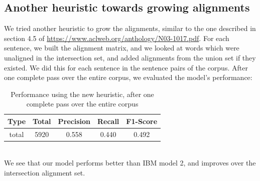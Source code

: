 \documentclass{article}
\begin{document}
	\subsection{Another heuristic towards growing alignments}
	We tried another heuristic to grow the alignments, similar to the one described in section 4.5 of \href{https://www.aclweb.org/anthology/N03-1017.pdf}{https://www.aclweb.org/anthology/N03-1017.pdf}. For each sentence, we built the alignment matrix, and we looked at words which were unaligned in the intersection set, and added alignments from the union set if they existed. We did this for each sentence in the sentence pairs of the corpus. After one complete pass over the entire corpus, we evaluated the model's performance:
	\begin{table}[htbp]
	\center
	\begin{tabular}{|c|c|c|c|c|}
	\hline
	Type&Total&Precision&Recall&F1-Score\\
	\hline
	total&        5920&     0.558&        0.440&        0.492\\
	\hline
	\end{tabular}
	\caption{Performance using the new heuristic, after one complete pass over the entire corpus}
	\end{table}
	\\We see that our model performs better than IBM model 2, and improves over the intersection alignment set.
\end{document}
